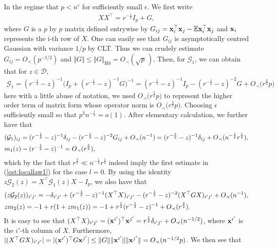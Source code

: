 \documentclass[12pt]{article}
\numberwithin{equation}{section}
\theoremstyle{remark}
\newcommand{\1}{{\rm 1}\kern-0.24em{\rm I}}
\begin{document}
\begin{appendices}
In the regime that $p< n^{\epsilon}$ for sufficiently small $\epsilon$. We first write 
\begin{align*}
{X}{X}^{\top} = r^{-\frac 12} I_p +{G}, 
\end{align*}
where ${G}$ is a $p$ by $p$ matrix defined entrywise by ${G}_{ij} = {\bf x}_i^{\top} {\bf x}_j - \mathbb{E}  {\bf x}_i^{\top} {\bf x}_j  $ and ${\bf x}_i$ represents the i-th row of ${X}$. One can easily see that ${G}_{ij}$ is asymptotically centred Gaussian with variance $1/p$  by CLT. Thus we can crudely estimate ${G}_{ij}= O_\prec(p^{-1/2})$ and  $\Vert {G}\Vert\leq \Vert G\Vert_{\text{HS}} = O_\prec(\sqrt p\, )$. Then, for $\mathcal{G}_1$, we can obtain that for $z\in \mathcal{D}$,
\begin{align*}
\mathcal{G}_1= (r^{-\frac 12} - z)^{-1} \Big(I_p +  (r^{-\frac 12} - z)^{-1} {G}\Big)^{-1}
=  (r^{-\frac 12} - z)^{-1}I_p  -  (r^{-\frac 12} - z)^{-2} G + O_\prec\big(r^{\frac 32} p\big)
\end{align*}
here with a little abuse of notation, we used $O_\prec\big(r^{\frac 32} p\big)$ to represent the higher order term of matrix form whose operator norm is $O_\prec\big(r^{\frac 32} p\big)$.  Choosing $\epsilon$ sufficiently small so that $p^{3}n^{-\frac 12} = o(1)$. After elementary calculation, we further have that 
\begin{align}
&(\mathcal{G}_1)_{ij} =  (r^{-\frac 12} - z)^{-1}  \delta_{ij}  -  (r^{-\frac 12} - z)^{-2}  {G}_{ij} + O_\prec(n^{-1})=  (r^{-\frac 12} - z)^{-1}  \delta_{ij}  + O_\prec(n^{-\frac 12}r^{\frac 12}),\notag\\
    & m_1(z) - (r^{-\frac 12} - z)^{-1} = O_\prec(r^{\frac 32}) , \label{2020121101}
\end{align}
which by the fact that $r^{\frac 32}\ll n^{-\frac 12}r^{\frac 12}$ indeed imply the first estimate in (\ref{est:locallaw1}) for the case $l=0$. By using the identity $z\mathcal{G}_2(z) = {X}^{\top} \mathcal{G}_1(z) {X} - I_p$, we also have that 
\begin{align}
&(z\mathcal{G}_2(z) )_{i'j'} = -\delta_{i'j'} + (r^{-\frac 12} - z)^{-1} ({X}^{\top} {X}) _{i'j'} -   (r^{-\frac 12} - z)^{-2} ( {X}^{\top} {G} {X})_{i'j'} + O_\prec(n^{-1}), \notag\\
&zm_2(z) = -1 + r(1+ zm_1(z)) = -1 + r^{\frac 12}(r^{-\frac 12} - z)^{-1} +  O_\prec(r^{\frac 32}). \label{2020121102}
\end{align}
It is easy to see that $ ({X}^{\top} {X}) _{i'j'} =( {\bf x}^{i'})^{\top}  {\bf x}^{j'} =  r^{\frac 12}\delta_{i'j'} + O_\prec(n^{-1/2})$, where ${\bf x}^{i'}$ is the $i'$-th column of ${X}$. Furthermore, $|( {X}^{\top} G {X})_{i'j'}|= |( {\bf x}^{i'})^{\top} G {\bf x}^{j'}| \leq \Vert G \Vert \Vert {\bf x}^{i'}\Vert \Vert {\bf x}^{j'}\Vert =   O_\prec(n^{-1/2}p)$. We then see that 

\end{appendices}
\end{document}
